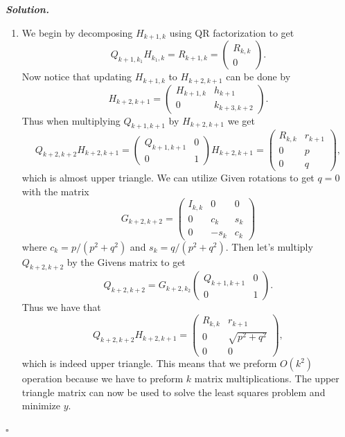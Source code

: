 \documentclass[12pt]{report}
\newenvironment{solution}[1][\it{Solution}]{\textbf{#1. } }{$\square$}
\begin{document}
\begin{solution}
    
    \begin{enumerate}
        \item 
        We begin by decomposing $H_{k+1,k}$ using QR factorization to get
        \[ 
            Q_{k+1,k_1}H_{k_1,k} = R_{k+1,k} = \begin{pmatrix}
                R_{k,k}\\0
            \end{pmatrix}.
        \]
        Now notice that updating $H_{k+1,k}$ to $H_{k+2,k+1}$ can be done by
        \[ 
            H_{k+2,k+1} = \begin{pmatrix}
                H_{k+1,k} & h_{k+1}\\
                0 & k_{k+3,k+2}
            \end{pmatrix}.
        \]
        Thus when multiplying $Q_{k+1,k+1}$ by $H_{k+2,k+1}$ we get
        \[ 
            Q_{k+2,k+2}H_{k+2,k+1} = \begin{pmatrix}
                Q_{k+1,k+1} & 0 \\
                0 & 1
            \end{pmatrix} H_{k+2,k+1} = \begin{pmatrix}
                R_{k,k} & r_{k+1}\\
                0 & p\\
                0 & q
            \end{pmatrix},
        \]
        which is almost upper triangle. We can utilize Given rotations to get $q = 0$ with the matrix
        \[ 
            G_{k+2,k+2} = \begin{pmatrix}
                I_{k,k} & 0 & 0\\
                0 & c_k & s_k\\
                0 & -s_k & c_k
            \end{pmatrix}
        \]
        where $c_k = p/(p^2 + q^2)$ and $s_k = q/(p^2 + q^2).$ Then let's multiply $Q_{k+2,k+2}$ by the Givens matrix to get
        \[
            Q_{k+2,k+2} = G_{k+2,k_2}\begin{pmatrix}
                Q_{k+1,k+1} & 0 \\
                0 & 1
            \end{pmatrix}.
        \]
        Thus we have that
        \[ 
            Q_{k+2,k+2}H_{k+2,k+1} = \begin{pmatrix}
                R_{k,k} & r_{k+1}\\
                0 & \sqrt{p^2 + q^2}\\
                0 & 0
            \end{pmatrix},
        \]
        which is indeed upper triangle. This means that we preform $O(k^2)$ operation because we have to preform $k$ matrix multiplications. The upper triangle matrix can now be used to solve the least squares problem and minimize $y$. 


\end{enumerate}
\end{solution}
\end{document}
